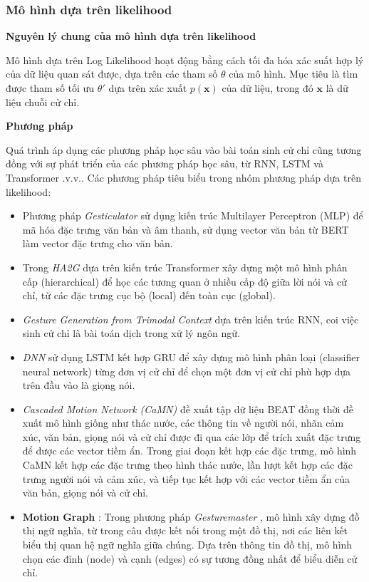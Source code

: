 \subsubsection{Mô hình dựa trên likelihood}

\textbf{Nguyên lý chung của mô hình dựa trên likelihood}

Mô hình dựa trên Log Likelihood hoạt động bằng cách tối đa hóa xác suất hợp lý của dữ liệu quan sát được, dựa trên các tham số $\theta$ của mô hình. Mục tiêu là tìm được tham số tối ưu $\theta'$ dựa trên xác xuất $p(\mathbf{x})$ của dữ liệu, trong đó $\mathbf{x}$ là dữ liệu chuỗi cử chỉ.

\textbf{Phương pháp}

Quá trình áp dụng các phương pháp học sâu vào bài toán sinh cử chỉ cũng tương đồng với sự phát triển của các phương pháp học sâu, từ RNN, LSTM và Transformer .v.v.. Các phương pháp tiêu biểu trong nhóm phương pháp dựa trên likelihood:

\begin{itemize}[]
	\item Phương pháp \textit{Gesticulator} \cite{kucherenko2020gesticulator} sử dụng kiến trúc Multilayer Perceptron (MLP) để mã hóa đặc trưng văn bản và âm thanh, sử dụng vector văn bản từ BERT làm vector đặc trưng cho văn bản. 
	
	\item Trong \textit{HA2G} \cite{liu2022learning} dựa trên kiến trúc Transformer xây dựng một mô hình phân cấp (hierarchical) để học các tương quan ở nhiều cấp độ giữa lời nói và cử chỉ, từ các đặc trưng cục bộ (local) đến toàn cục (global). 
	
	\item \textit{Gesture Generation from Trimodal Context} \cite{yoon2020speech} dựa trên kiến trúc RNN, coi việc sinh cử chỉ là bài toán dịch trong xử lý ngôn ngữ. 
	
	\item \textit{DNN} \cite{chiu2015predicting} sử dụng LSTM kết hợp GRU để xây dựng mô hình phân loại (classifier neural network) từng đơn vị cử chỉ để chọn một đơn vị cử chỉ phù hợp dựa trên đầu vào là giọng nói. 
	
	\item \textit{Cascaded Motion Network (CaMN)} \cite{liu2022beat} đề xuất tập dữ liệu BEAT đồng thời đề xuất mô hình giống như thác nước, các thông tin về người nói, nhãn cảm xúc, văn bản, giọng nói và cử chỉ được đi qua các lớp để trích xuất đặc trưng để được các vector tiềm ẩn. Trong giai đoạn kết hợp các đặc trưng, mô hình CaMN kết hợp các đặc trưng theo hình thác nước, lần lượt kết hợp các đặc trưng người nói và cảm xúc, và tiếp tục kết hợp với các vector tiềm ẩn của văn bản, giọng nói và cử chỉ.
	
	\item \textbf{Motion Graph} : Trong phương pháp \textit{Gesturemaster} \cite{zhou2022gesturemaster}, mô hình xây dựng đồ thị ngữ nghĩa, từ trong câu được kết nối trong một đồ thị, nơi các liên kết biểu thị quan hệ ngữ nghĩa giữa chúng. Dựa trên thông tin đồ thị, mô hình chọn các đỉnh (node) và cạnh (edges) có sự tương đồng nhất để biểu diễn cử chỉ. 
	
\end{itemize}

